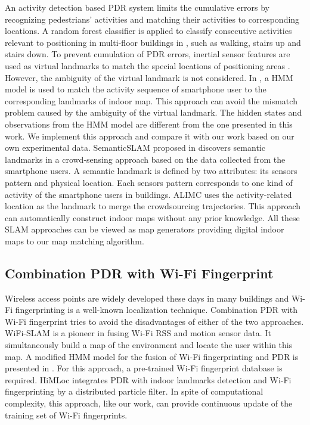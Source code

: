 \documentclass{llncs}
\begin{document}
An activity detection based PDR system limits the cumulative errors by recognizing pedestrians' activities and matching their activities to corresponding locations. A random forest classifier is applied to classify consecutive activities relevant to positioning in multi-floor buildings in \cite{bobkov2015activity}, such as walking, stairs up and stairs down. To prevent cumulation of PDR errors, inertial sensor features are used as virtual landmarks to match the special locations of positioning areas \cite{guo2017activity}. However, the ambiguity of the virtual landmark is not considered. In \cite{zhou2015activity}, a HMM model is used to match the activity sequence of smartphone user to the corresponding landmarks of indoor map. This approach can avoid the mismatch problem caused by the ambiguity of the virtual landmark. The hidden states and observations from the HMM model are different from the one presented in this work. We implement this approach and compare it with our work based on our own experimental data. SemanticSLAM proposed in \cite{abdelnasser2016semanticslam} discovers semantic landmarks in a crowd-sensing approach based on the data collected from the smartphone users. A semantic landmark is defined by two attributes: its sensors pattern and physical location. Each sensors pattern corresponds to one kind of activity of the smartphone users in buildings. ALIMC \cite{zhou2015alimc} uses the activity-related location as the landmark to merge the crowdsourcing trajectories. This approach can automatically construct indoor maps without any prior knowledge. All these SLAM approaches can be viewed as map generators providing digital indoor maps to our map matching algorithm.

\subsection{Combination PDR with Wi-Fi Fingerprint}

Wireless access points are widely developed these days in many buildings and Wi-Fi fingerprinting is a well-known localization technique. Combination PDR with Wi-Fi fingerprint tries to avoid the disadvantages of either of the two approaches. WiFi-SLAM \cite{Ferris2007WiFi} is a pioneer in fusing Wi-Fi RSS and motion sensor data. It simultaneously build a map of the environment and locate the user within this map. A modified HMM model for the fusion of Wi-Fi fingerprinting and PDR is presented in \cite{hoang2013hidden}. For this approach, a pre-trained Wi-Fi fingerprint database is required. HiMLoc \cite{radu2013himloc} integrates PDR with indoor landmarks detection and Wi-Fi fingerprinting by a distributed particle filter. In spite of computational complexity, this approach, like our work, can provide continuous update of the training set of Wi-Fi fingerprints.
\end{document}
